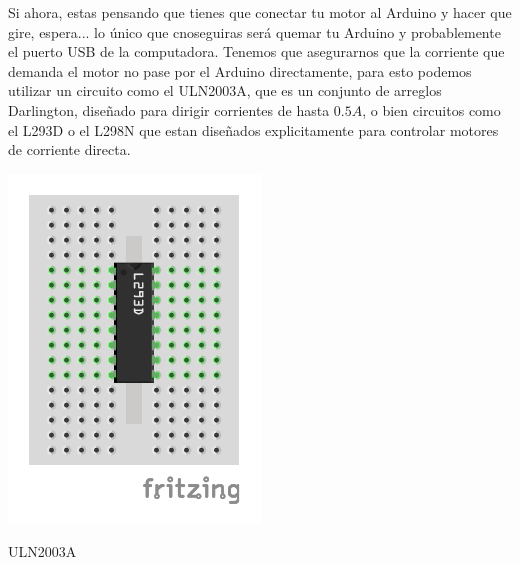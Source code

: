 		Si ahora, estas pensando que tienes que conectar tu motor al Arduino y hacer que gire, espera... lo único que cnoseguiras será quemar tu Arduino y probablemente el puerto USB de la computadora. Tenemos que asegurarnos que la corriente que demanda el motor no pase por el Arduino directamente, para esto podemos utilizar un circuito como el ULN2003A, que es un conjunto de arreglos Darlington, diseñado para dirigir corrientes de hasta $0.5A$, o bien circuitos como el L293D o el L298N que estan diseñados explicitamente para controlar motores de corriente directa.

		\begin{marginfigure}
			\begin{center}
				\includegraphics[width=\textwidth]{images/L293D.pdf}
				\caption{ULN2003A}
				\label{fig:CI}
			\end{center}
		\end{marginfigure}

